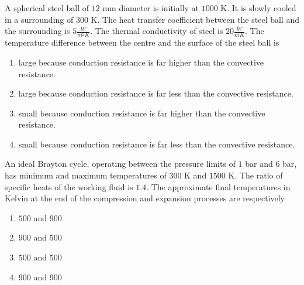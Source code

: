 \iffalse
                       
                        
                        
                        
                    
                        \author{AI24BTECH11006 - Bugada Roopansha}
                        \section{me}
                        \chapter{2011}
                        \fi

    \item A spherical steel ball of $12$ mm diameter is initially at $1000$ K. It is slowly cooled in a surrounding of $300$ K. The heat transfer coefficient between the steel ball and the surrounding is $5 \frac{W}{m^2 K}$. The thermal conductivity of steel is $20 \frac{W}{mK}$. The temperature difference between the centre and the surface of the steel ball is
    \begin{enumerate}
        \item large because conduction resistance is far higher than the convective resistance.
        \item large because conduction resistance is far less than the convective resistance.
        \item small because conduction resistance is far higher than the convective resistance.
        \item small because conduction resistance is far less than the convective resistance.
    \end{enumerate}

    \item An ideal Brayton cycle, operating between the pressure limits of $1$ bar and $6$ bar, has minimum and maximum temperatures of $300$ K and $1500$ K. The ratio of specific heats of the working fluid is $1.4$. The approximate final temperatures in Kelvin at the end of the compression and expansion processes are respectively
    \begin{enumerate}
        \item $500$ and $900$
        \item $900$ and $500$
        \item $500$ and $500$
        \item $900$ and $900$
    \end{enumerate}

